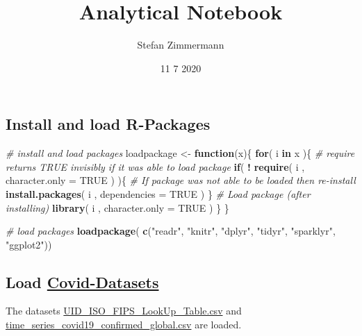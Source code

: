 \documentclass[]{article}
\title{Analytical Notebook}
\author{Stefan Zimmermann}
\date{11 7 2020}
\newenvironment{Shaded}{\begin{snugshade}}{\end{snugshade}}
\newcommand{\CommentTok}[1]{\textcolor[rgb]{0.56,0.35,0.01}{\textit{#1}}}
\newcommand{\ControlFlowTok}[1]{\textcolor[rgb]{0.13,0.29,0.53}{\textbf{#1}}}
\newcommand{\DataTypeTok}[1]{\textcolor[rgb]{0.13,0.29,0.53}{#1}}
\newcommand{\KeywordTok}[1]{\textcolor[rgb]{0.13,0.29,0.53}{\textbf{#1}}}
\newcommand{\NormalTok}[1]{#1}
\newcommand{\OperatorTok}[1]{\textcolor[rgb]{0.81,0.36,0.00}{\textbf{#1}}}
\newcommand{\OtherTok}[1]{\textcolor[rgb]{0.56,0.35,0.01}{#1}}
\newcommand{\StringTok}[1]{\textcolor[rgb]{0.31,0.60,0.02}{#1}}
\begin{document}
\maketitle

\hypertarget{install-and-load-r-packages}{%
\subsection{Install and load
R-Packages}\label{install-and-load-r-packages}}

\begin{Shaded}
\begin{Highlighting}[]
\CommentTok{# install and load packages}
\NormalTok{loadpackage <-}\StringTok{ }\ControlFlowTok{function}\NormalTok{(x)\{}
  \ControlFlowTok{for}\NormalTok{( i }\ControlFlowTok{in}\NormalTok{ x )\{}
    \CommentTok{#  require returns TRUE invisibly if it was able to load package}
    \ControlFlowTok{if}\NormalTok{( }\OperatorTok{!}\StringTok{ }\KeywordTok{require}\NormalTok{( i , }\DataTypeTok{character.only =} \OtherTok{TRUE}\NormalTok{ ) )\{}
      \CommentTok{#  If package was not able to be loaded then re-install}
      \KeywordTok{install.packages}\NormalTok{( i , }\DataTypeTok{dependencies =} \OtherTok{TRUE}\NormalTok{ )}
\NormalTok{    \}}
    \CommentTok{#  Load package (after installing)}
    \KeywordTok{library}\NormalTok{( i , }\DataTypeTok{character.only =} \OtherTok{TRUE}\NormalTok{ )}
\NormalTok{  \}}
\NormalTok{\}}

\CommentTok{# load packages}
\KeywordTok{loadpackage}\NormalTok{( }\KeywordTok{c}\NormalTok{(}\StringTok{"readr"}\NormalTok{, }\StringTok{"knitr"}\NormalTok{, }\StringTok{"dplyr"}\NormalTok{, }\StringTok{"tidyr"}\NormalTok{, }\StringTok{"sparklyr"}\NormalTok{, }\StringTok{"ggplot2"}\NormalTok{))}
\end{Highlighting}
\end{Shaded}

\hypertarget{load-covid-datasets}{%
\subsection{\texorpdfstring{Load
\href{https://github.com/CSSEGISandData/COVID-19/tree/master/csse_covid_19_data}{Covid-Datasets}}{Load Covid-Datasets}}\label{load-covid-datasets}}

The datasets
\href{https://raw.githubusercontent.com/CSSEGISandData/COVID-19/master/csse_covid_19_data/UID_ISO_FIPS_LookUp_Table.csv}{UID\_ISO\_FIPS\_LookUp\_Table.csv}
and
\href{https://raw.githubusercontent.com/CSSEGISandData/COVID-19/master/csse_covid_19_data/csse_covid_19_time_series/time_series_covid19_confirmed_global.csv}{time\_series\_covid19\_confirmed\_global.csv}
are loaded.
\end{document}
